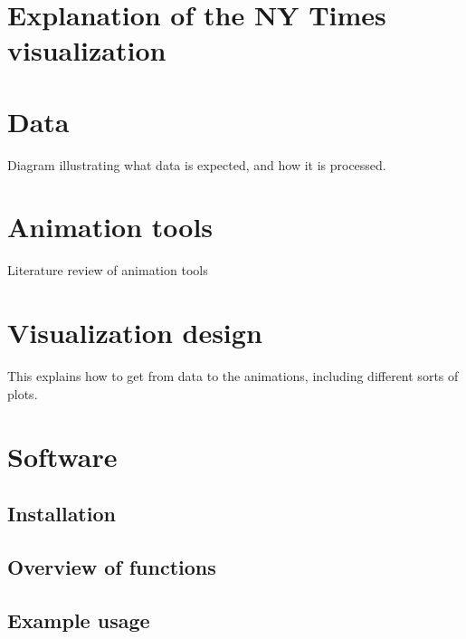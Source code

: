 \hypertarget{explanation-of-the-ny-times-visualization}{%
\section{Explanation of the NY Times visualization}\label{explanation-of-the-ny-times-visualization}}

\hypertarget{data}{%
\section{Data}\label{data}}

Diagram illustrating what data is expected, and how it is processed.

\hypertarget{animation-tools}{%
\section{Animation tools}\label{animation-tools}}

Literature review of animation tools

\hypertarget{visualization-design}{%
\section{Visualization design}\label{visualization-design}}

This explains how to get from data to the animations, including different sorts of plots.

\hypertarget{software}{%
\section{Software}\label{software}}

\hypertarget{installation}{%
\subsection{Installation}\label{installation}}

\hypertarget{overview-of-functions}{%
\subsection{Overview of functions}\label{overview-of-functions}}

\hypertarget{example-usage}{%
\subsection{Example usage}\label{example-usage}}

